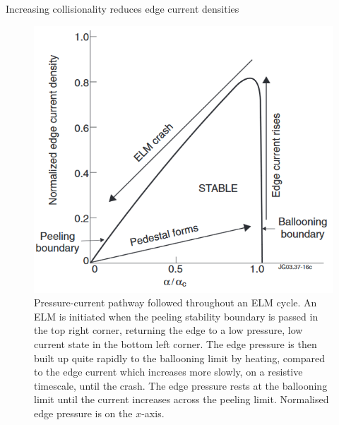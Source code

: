 \documentclass[12pt]{article}  %
\begin{document}
Increasing collisionality reduces edge current densities 

\begin{figure}
\includegraphics[scale=0.5]{Figures/ELMcrash.png}
\centering
\caption{Pressure-current pathway followed throughout an ELM cycle\cite{Perez2004}. An ELM is initiated when the peeling stability boundary is passed in the top right corner, returning the edge to a low pressure, low current state in the bottom left corner. The edge pressure is then built up quite rapidly to the ballooning limit by heating, compared to the edge current which increases more slowly, on a resistive timescale, until the crash. The edge pressure rests at the ballooning limit until the current increases across the peeling limit. Normalised edge pressure is on the $x$-axis.}\label{fig:PBcrash}
\end{figure}
\end{document}
